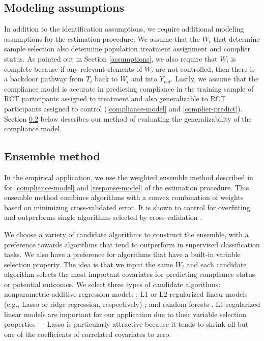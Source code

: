 \documentclass[hidelinks,12pt]{article}
\begin{document}
{{\subsection{Modeling assumptions}  \label{modeling-assumptions}
}
In addition to the identification assumptions, we require additional modeling assumptions for the estimation procedure. We assume that the $W_i$ that determine sample selection also determine population treatment assignment and complier status. As pointed out in Section \ref{assumptions}, we also require that $W_i$ is complete because if any relevant elements of $W_i$ are not controlled, then there is a backdoor pathway from $T_i$ back to $W_i$ and into $Y_{isd}$. Lastly, we assume that the compliance model is accurate in predicting compliance in the training sample of RCT participants assigned to treatment and also generalizable to RCT participants assigned to control (\ref{compliance-model} and \ref{complier-predict}). Section \ref{ensemble} below describes our method of evaluating the generalizability of the compliance model.

{\color{red}
\subsection{Ensemble method}  \label{ensemble}
}

In the empirical application, we use the weighted ensemble method described in \citet{van2007} for \ref{compliance-model} and \ref{response-model} of the estimation procedure. This ensemble method combines algorithms with a convex combination of weights based on minimizing cross-validated error. It is shown to control for overfitting and outperforms single algorithms selected by cross-validation \citep{polley2010super}. 

We choose a variety of candidate algorithms to construct the ensemble, with a preference towards algorithms that tend to outperform in supervised classification tasks. We also have a preference for algorithms that have a built-in variable selection property. The idea is that we input the same $W_i$ and each candidate algorithm selects the most important covariates for predicting compliance status or potential outcomes. We select three types of candidate algorithms: nonparametric additive regression models \citep{buja1989linear}; L1 or L2-regularized linear models (e.g., Lasso or ridge regression, respectively) \citep{tibshirani2012strong}; and random forests \citep{breiman2001}. L1-regularized linear models are important for our application due to their variable selection properties --- Lasso is particularly attractive because it tends to shrink all but one of the coefficients of correlated covariates to zero. 

}
\end{document}
